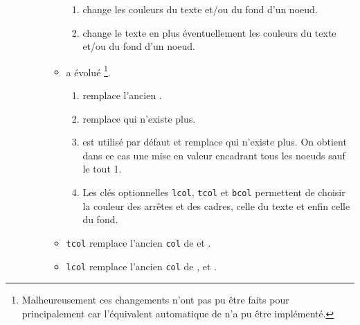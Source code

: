 \documentclass[12pt,a4paper]{article}
\begin{document}
\begin{description}
\begin{itemize}[itemsep=.5em]
\begin{itemize}[itemsep=.5em]
\begin{enumerate}
            	\item {} change les couleurs du texte et/ou du fond d'un noeud.
    
            	\item {} change le texte en plus éventuellement  les couleurs du texte et/ou du fond d'un noeud.
            \end{enumerate}
    
    
            \item {} a évolué
                  \footnote{
                  		Malheureusement ces changements n'ont pas pu être faits pour  principalement car l'équivalent automatique de  n'a pu être implémenté.
    			  }.
    
            \begin{enumerate}
            	\item {} remplace l'ancien .
    
            	\item {} remplace  qui n'existe plus.
    
            	\item {} est utilisé par défaut et remplace  qui n'existe plus. On obtient dans ce cas une mise en valeur encadrant tous les noeuds sauf le tout 1\ier{}.
    
            	\item Les clés optionnelles \verb#lcol#, \verb#tcol# et \verb#bcol# permettent de choisir la couleur des arrêtes et des cadres, celle du texte et enfin celle du fond.
            \end{enumerate}
    
    
            \item \verb#tcol# remplace l'ancien \verb#col# de  et .
    
    		\item \verb#lcol# remplace l'ancien \verb#col# de ,  et .
    
    
    
        \end{itemize}
    \end{itemize}
    
    
    \separation



\end{description}
\end{document}
